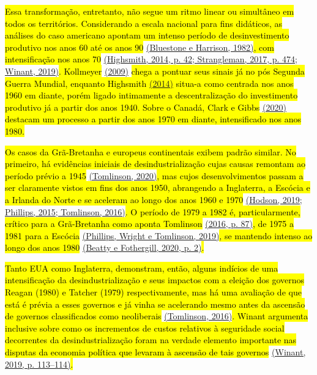 \hl{Essa transformação, entretanto, não segue um ritmo linear ou
simultâneo em todos os territórios. Considerando a escala nacional para
fins didáticos, as análises do caso americano apontam um intenso período
de desinvestimento produtivo nos anos 60 até os anos 90}
\href{https://www.zotero.org/google-docs/?Wbf6Ja}{(Bluestone e Harrison,
1982)}\hl{, com intensificação nos anos 70}
\href{https://www.zotero.org/google-docs/?epVUGe}{(Highsmith, 2014, p.
42; Strangleman, 2017, p. 474; Winant, 2019)}\hl{. Kollmeyer}
\href{https://www.zotero.org/google-docs/?00gScK}{(2009)} \hl{chega a
pontuar seus sinais já no pós Segunda Guerra Mundial, enquanto Highsmith
\href{https://www.zotero.org/google-docs/?BapSZJ}{(2014)} situa-a como
centrada nos anos 1960 em diante, porém ligado intimamente a
descentralização do investimento produtivo já a partir dos anos 1940.
Sobre o Canadá, Clark e Gibbs}
\href{https://www.zotero.org/google-docs/?840iJG}{(2020)} \hl{destacam
um processo a partir dos anos 1970 em diante, intensificado nos anos
1980.}

\hl{Os casos da Grã-Bretanha e europeus continentais exibem padrão
similar. No primeiro, há evidências iniciais de desindustrialização
cujas causas remontam ao período prévio a 1945}
\href{https://www.zotero.org/google-docs/?a0K08l}{(Tomlinson,
2020)}\hl{, mas cujos desenvolvimentos passam a ser claramente vistos em
fins dos anos 1950, abrangendo a Inglaterra, a Escócia e a Irlanda do
Norte e se aceleram ao longo dos anos 1960 e 1970}
\href{https://www.zotero.org/google-docs/?NhrNAK}{(Hodson, 2019;
Phillips, 2015; Tomlinson, 2016)}\hl{. O período de 1979 a 1982 é,
particularmente, crítico para a Grã-Bretanha como aponta Tomlinson}
\href{https://www.zotero.org/google-docs/?J7dR83}{(2016, p. 87)}\hl{, de
1975 a 1981 para a Escócia}
\href{https://www.zotero.org/google-docs/?QXPNE6}{(Phillips, Wright e
Tomlinson, 2019)}\hl{, se mantendo intenso ao longo dos anos 1980}
\href{https://www.zotero.org/google-docs/?DcU6gD}{(Beatty e Fothergill,
2020, p. 2)}\hl{.}

\hl{Tanto EUA como Inglaterra, demonstram, então, alguns indícios de uma
intensificação da desindustrialização e seus impactos com a eleição dos
governos Reagan (1980) e Tatcher (1979) respectivamente, mas há uma
avaliação de que está é prévia a esses governos e já vinha se acelerando
mesmo antes da ascensão de governos classificados como neoliberais}
\href{https://www.zotero.org/google-docs/?fFlzMu}{(Tomlinson,
2016)}\hl{. Winant argumenta inclusive sobre como os incrementos de
custos relativos à seguridade social decorrentes da desindustrialização
foram na verdade elemento importante nas disputas da economia política
que levaram à ascensão de tais governos}
\href{https://www.zotero.org/google-docs/?mfJsD7}{(Winant, 2019, p.
113--114)}\hl{.}

